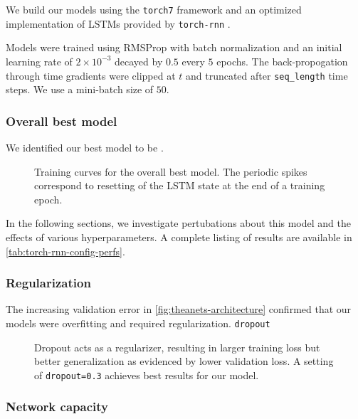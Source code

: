 We build our models using the \texttt{torch7} framework and
an optimized implementation of LSTMs provided by \texttt{torch-rnn} .

Models were trained using RMSProp  with batch normalization 
and an initial learning rate of $2 \times 10^{-3}$ decayed by $0.5$ every $5$
epochs. The back-propogation through time gradients were clipped
at $t$  and truncated after \texttt{seq\_length} time steps.
We use a mini-batch size of $50$.

\subsubsection{Overall best model}

We identified our best model to be .

\begin{figure}[tb]
  \centering
  
  \caption{Training curves for the overall best model. The periodic spikes correspond
  to resetting of the LSTM state at the end of a training epoch.}
  \label{fig:torch-rnn-best-model-trace}
\end{figure}

In the following sections, we investigate pertubations about this model and the
effects of various hyperparameters. A complete listing of results are available
in \cref{tab:torch-rnn-config-perfs}.

\subsubsection{Regularization}

The increasing validation error in \cref{fig:theanets-architecture} confirmed
that our models were overfitting and required regularization. \texttt{dropout}

\begin{figure}[tb]
  \centering
  
  \caption{Dropout acts as a regularizer, resulting in larger training loss
  but better generalization as evidenced by lower validation loss. A setting of
\texttt{dropout=0.3} achieves best results for our model.}
  \label{fig:torch-rnn-dropout}
\end{figure}


\subsubsection{Network capacity}

